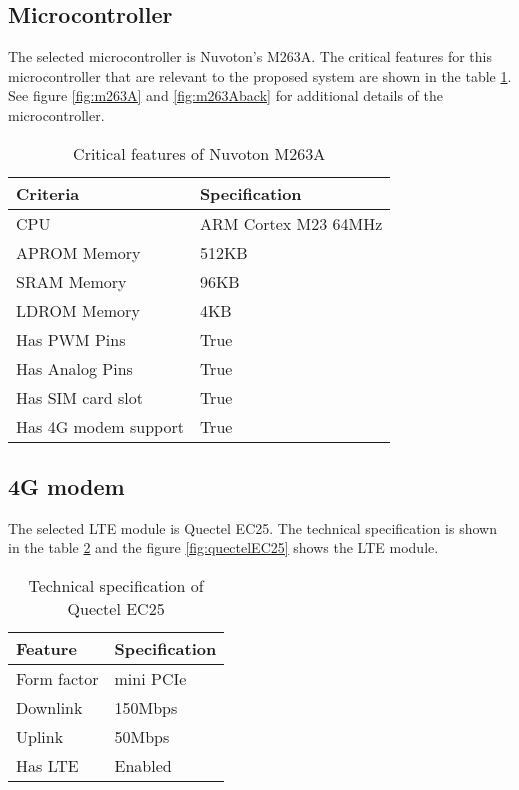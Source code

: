 \documentclass[../thesis.tex]{subfiles}
\begin{document}
\subsection{Microcontroller}

The selected microcontroller is Nuvoton's M263A. The critical features for this microcontroller that are relevant to the proposed system are shown in the table \ref{tab:microcontrollerSpecification}. See figure \ref{fig:m263A} and \ref{fig:m263Aback} for additional details of the microcontroller.

\begin{table}[h!]
\begin{center}
\caption{Critical features of Nuvoton M263A}
\label{tab:microcontrollerSpecification}
\begin{tabular}{l|l}
\toprule
\textbf{Criteria} & \textbf{Specification}\\
\midrule
CPU & ARM Cortex M23 64MHz\\
APROM Memory & 512KB\\
SRAM Memory & 96KB\\
LDROM Memory & 4KB\\
Has PWM Pins & True\\
Has Analog Pins & True\\
Has SIM card slot & True\\
Has 4G modem support & True\\
\bottomrule
\end{tabular}
\end{center}
\end{table}

\subsection{4G modem}

The selected LTE module is Quectel EC25. The technical specification is shown in the table \ref{tab:quectelEC25} and the figure \ref{fig:quectelEC25} shows the LTE module.

\begin{table}[h!]
\begin{center}
\caption{Technical specification of Quectel EC25}
\label{tab:quectelEC25}
\begin{tabular}{l|l}
\toprule
\textbf{Feature} & \textbf{Specification}\\
\midrule
Form factor & mini PCIe\\
Downlink & 150Mbps\\
Uplink & 50Mbps\\
Has LTE & Enabled\\
\bottomrule
\end{tabular}
\end{center}
\end{table}
\end{document}
